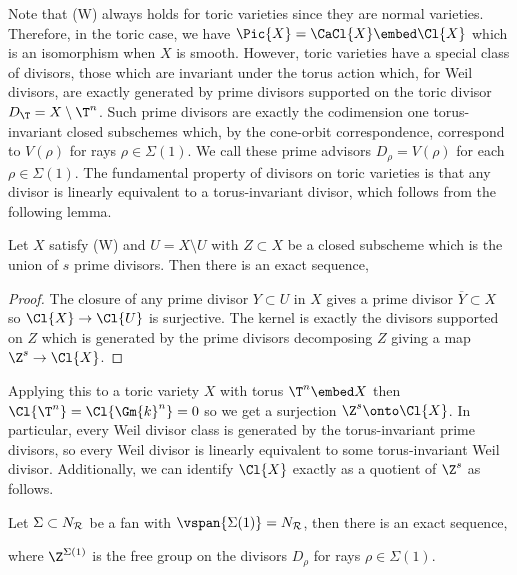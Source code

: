 Note that (W) always holds for toric varieties since they are normal varieties. Therefore, in the toric case, we have $\Pic{X} = \CaCl{X} \embed \Cl{X}$ which is an isomorphism when $X$ is smooth. However, toric varieties have a special class of divisors, those which are invariant under the torus action which, for Weil divisors, are exactly generated by prime divisors supported on the toric divisor $D_\T = X \setminus \T^n$. Such prime divisors are exactly the codimension one torus-invariant closed subschemes which, by the cone-orbit correspondence, correspond to $V(\rho)$ for rays $\rho \in \Sigma(1)$. We call these prime advisors $D_\rho = V(\rho)$ for each $\rho \in \Sigma(1)$. The fundamental property of divisors on toric varieties is that any divisor is linearly equivalent to a torus-invariant divisor, which follows from the following lemma.

\begin{lemma}
Let $X$ satisfy (W) and $U = X \setminus U$ with $Z \subset X$ be a closed subscheme which is the union of $s$ prime divisors. Then there is an exact sequence,
\begin{center}
\end{center}
\end{lemma}

\begin{proof}
The closure of any prime divisor $Y \subset U$ in $X$ gives a prime divisor $\overline{Y} \subset X$ so $\Cl{X} \to \Cl{U}$ is surjective. The kernel is exactly the divisors supported on $Z$ which is generated by the prime divisors decomposing $Z$ giving a map $\Z^s \to \Cl{X}$.  
\end{proof}
\noindent
Applying this to a toric variety $X$ with torus $\T^n \embed X$ then $\Cl{\T^n} = \Cl{\Gm{k}^n} = 0$ so we get a surjection $\Z^s \onto \Cl{X}$. In particular, every Weil divisor class is generated by the torus-invariant prime divisors, so every Weil divisor is linearly equivalent to some torus-invariant Weil divisor. Additionally, we can identify $\Cl{X}$ exactly as a quotient of $\Z^s$ as follows. 

\begin{prop}
Let $\Sigma \subset N_{\mathcal{R}}$ be a fan with $\vspan{\Sigma(1)} = N_\R$, then there is an exact sequence,
\begin{center}
\end{center}
where $\Z^{\Sigma(1)}$ is the free group on the divisors $D_\rho$ for rays $\rho \in \Sigma(1)$. 
\end{prop}

